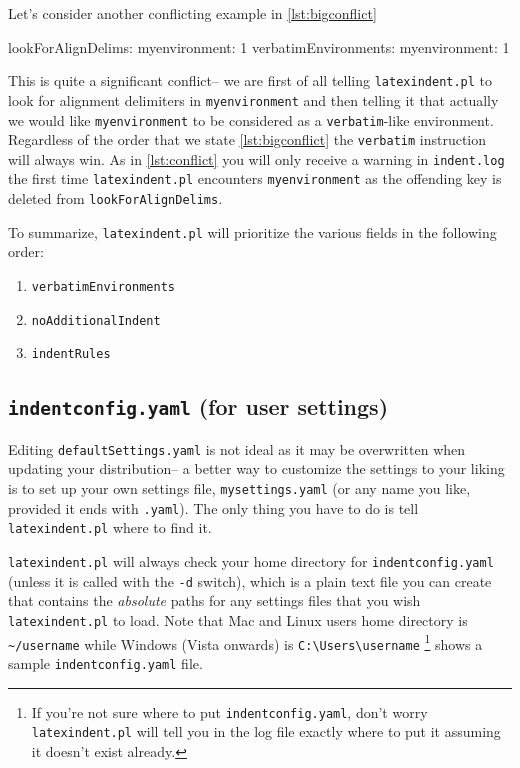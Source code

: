 Let's consider another conflicting example in \cref{lst:bigconflict}
\begin{yaml}[caption={More conflicting ideas},label={lst:bigconflict}]
lookForAlignDelims:
   myenvironment: 1
verbatimEnvironments:
   myenvironment: 1
\end{yaml}
This is quite a significant conflict-- we are first of all telling \lstinline!latexindent.pl!
to look for alignment delimiters in \lstinline!myenvironment! and then 
telling it that actually we would like \lstinline!myenvironment! to be considered 
as a \lstinline!verbatim!-like environment. Regardless of the order that we 
state \cref{lst:bigconflict} the \lstinline!verbatim! instruction will always win.
As in \cref{lst:conflict} you will only receive a warning in \lstinline!indent.log! the 
first time \lstinline!latexindent.pl! encounters \lstinline!myenvironment! as the 
offending key is deleted from \lstinline!lookForAlignDelims!.
 	 	 	 	 	
To summarize, \lstinline!latexindent.pl! will prioritize the various fields in the 
following order:
\begin{enumerate}
	\item \lstinline!verbatimEnvironments!
	\item \lstinline!noAdditionalIndent!
	\item \lstinline!indentRules!
\end{enumerate}
\subsection{\lstinline!indentconfig.yaml! (for user settings)}\label{sec:indentconfig}
Editing \lstinline!defaultSettings.yaml! is not ideal as it may be overwritten when 
updating your distribution-- a better way to customize the settings to your liking 
is to set up your own settings file, 
\lstinline!mysettings.yaml! (or any name you like, provided it ends with \lstinline!.yaml!). 
The only thing you have to do is tell \lstinline!latexindent.pl! where to find it. 
 	 	 	 	 	
\lstinline!latexindent.pl! will always check your home directory for \lstinline!indentconfig.yaml! (unless 
it is called with the \lstinline!-d! switch), 
which is a plain text file you can create that contains the \emph{absolute}
paths for any settings files that you wish \lstinline!latexindent.pl! to load.
Note that Mac and Linux users home directory is \lstinline!~/username! while
Windows (Vista onwards) is \lstinline!C:\Users\username! \footnote{If you're not sure 
	where to put \lstinline!indentconfig.yaml!, don't 
	worry \lstinline!latexindent.pl! will tell you in the log file exactly where to 
put it assuming it doesn't exist already.}
 shows a sample \lstinline!indentconfig.yaml! file.
 	 	 	 	 	
